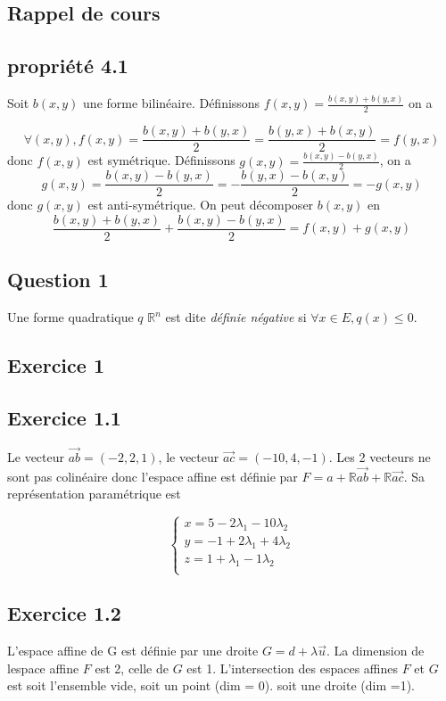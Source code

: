 \documentclass[]{book}
\theoremstyle{definition}
\newcommand{\bb}[1]{\mathbb{#1}}
\newcommand{\R}{\bb{R}}
\newcommand{\vect}[1]{\overrightarrow{#1}}
\begin{document}
\subsection*{Rappel de cours}

\subsection*{propri\'et\'e 4.1}
Soit $b(x,y)$ une forme bilin\'eaire. D\'efinissons $f(x,y) = \frac{b(x,y)+b(y,x)}{2}$ on a 

$$\forall (x,y), f(x, y) = \frac{b(x,y)+b(y,x)}{2} = \frac{b(y,x)+b(x,y)}{2} = f(y,x)$$
donc $f(x,y)$ est sym\'etrique. D\'efinissons $g(x,y) = \frac{b(x,y) - b(y,x)}{2}$, on a 
$$g(x,y) =  \frac{b(x,y) - b(y,x)}{2} = -\frac{b(y,x) - b(x,y)}{2} = -g(x,y)$$
donc $g(x,y)$ est anti-sym\'etrique. On peut d\'ecomposer $b(x,y)$ en 
$$\frac{b(x,y) + b(y,x)}{2} + \frac{b(x,y) - b(y,x)}{2} = f(x,y) + g(x,y)$$



\newpage
\subsection*{Question 1}
Une forme quadratique $q$ $\R^n$ est dite \emph{d\'efinie n\'egative} si $\forall x \in E, q(x) \leq 0$. 


\subsection*{Exercice 1}
\subsection*{Exercice 1.1}
Le vecteur $\vect{ab} = (-2,2,1)$, le vecteur $\vect{ac} = (-10, 4, -1)$. Les 2 vecteurs ne sont pas colin\'eaire donc l'espace affine est d\'efinie par $F= a + \R \vect{ab} + \R \vect{ac}$. Sa repr\'esentation param\'etrique est

$$
\left\{
\begin{array}{l}
x = 5 -2\lambda_1 - 10\lambda_2\\
y = -1 +2\lambda_1 + 4\lambda_2\\
z = 1 +\lambda_1 - 1\lambda_2\\
\end{array}
\right.
$$

\subsection*{Exercice 1.2}
L'espace affine de G est d\'efinie par une droite $G = d + \lambda \vect{u}$. La dimension de lespace affine $F$ est 2, celle de $G$ est 1. L'intersection des espaces affines $F$ et $G$ est soit l'ensemble vide, soit un point (dim = 0). soit une droite (dim =1). 
\end{document}

